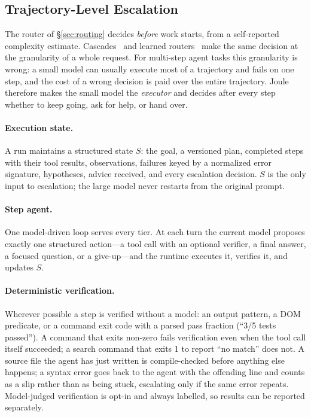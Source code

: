 
\subsection{Trajectory-Level Escalation}
\label{sec:escalation}

The router of \S\ref{sec:routing} decides \emph{before} work starts, from a self-reported complexity estimate.
Cascades~\cite{chen2023frugalgpt} and learned routers~\cite{ong2024routellm,ding2024hybrid} make the same decision at the granularity of a whole request.
For multi-step agent tasks this granularity is wrong: a small model can usually execute most of a trajectory and fails on one step, and the cost of a wrong decision is paid over the entire trajectory.
Joule therefore makes the small model the \emph{executor} and decides after every step whether to keep going, ask for help, or hand over.

\paragraph{Execution state.}
A run maintains a structured state $S$: the goal, a versioned plan, completed steps with their tool results, observations, failures keyed by a normalized error signature, hypotheses, advice received, and every escalation decision.
$S$ is the only input to escalation; the large model never restarts from the original prompt.

\paragraph{Step agent.}
One model-driven loop serves every tier.
At each turn the current model proposes exactly one structured action---a tool call with an optional verifier, a final answer, a focused question, or a give-up---and the runtime executes it, verifies it, and updates $S$.

\paragraph{Deterministic verification.}
Wherever possible a step is verified without a model: an output pattern, a DOM predicate, or a command exit code with a parsed pass fraction (``3/5 tests passed'').
A command that exits non-zero fails verification even when the tool call itself succeeded; a search command that exits 1 to report ``no match'' does not.
A source file the agent has just written is compile-checked before anything else happens; a syntax error goes back to the agent with the offending line and counts as a slip rather than as being stuck, escalating only if the same error repeats.
Model-judged verification is opt-in and always labelled, so results can be reported separately.

